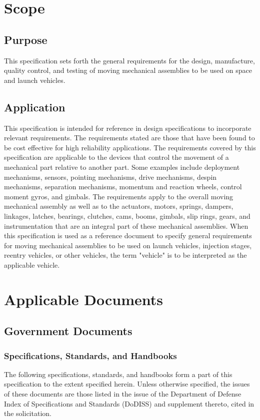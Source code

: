 \documentclass[12pt]{article}
\begin{document}
\newpage

\section{Scope}

\subsection{Purpose} 
This specification sets forth the general requirements for the design, manufacture, quality control, and testing of moving mechanical assemblies to be used on space and launch vehicles.

\subsection{Application}
This specification is intended for reference in design specifications to incorporate relevant requirements. 
The requirements stated are those that have been found to be cost effective for high reliability applications. 
The requirements covered by this specification are applicable to the devices that control the movement of a mechanical part relative to another part. 
Some examples include deployment mechanisms, sensors, pointing mechanisms, drive mechanisms, despin mechanisms, separation mechanisms, momentum and reaction wheels, control moment gyros, and gimbals. 
The requirements apply to the overall moving mechanical assembly as well as to the actuators, motors, springs, dampers, linkages, latches, bearings, clutches, cams, booms, gimbals, slip rings, gears, and instrumentation that are an integral part of these mechanical assemblies. 
When this specification is used as a reference document to specify general requirements for moving mechanical assemblies to be used on launch vehicles, injection stages, reentry vehicles, or other vehicles, the term "vehicle" is to be interpreted as the applicable vehicle.

\section{Applicable Documents}

\subsection{Government Documents}

\subsubsection{Specifications, Standards, and Handbooks}
The following specifications, standards, and handbooks form a part of this specification to the extent specified herein. 
Unless otherwise specified, the issues of these documents are those listed in the issue of the Department of Defense Index of Specifications and Standards (DoDISS) and supplement thereto, cited in the solicitation.
\end{document}
